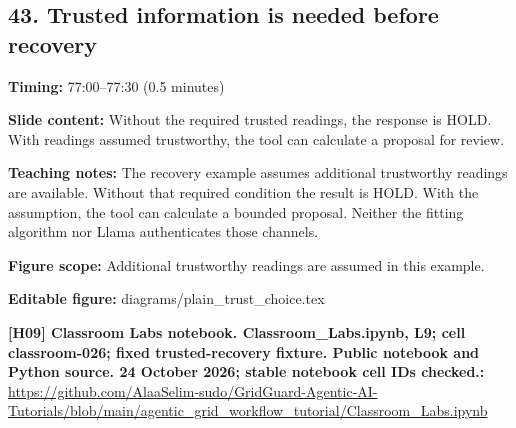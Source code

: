 \documentclass[10pt,letterpaper]{article}
\begin{document}
\subsection*{43. Trusted information is needed before recovery}
\textbf{Timing:} 77:00--77:30 (0.5 minutes)\par
\textbf{Slide content:} Without the required trusted readings, the response is HOLD.
With readings assumed trustworthy, the tool can calculate a proposal for review.\par
\textbf{Teaching notes:} The recovery example assumes additional trustworthy readings are available. Without that required condition the result is HOLD. With the assumption, the tool can calculate a bounded proposal. Neither the fitting algorithm nor Llama authenticates those channels.\par
\textbf{Figure scope:} Additional trustworthy readings are assumed in this example.\par
\textbf{Editable figure:} diagrams/plain\_trust\_choice.tex\par
\textbf{[H09] Classroom Labs notebook. Classroom\_Labs.ipynb, L9; cell classroom-026; fixed trusted-recovery fixture. Public notebook and Python source. 24 October 2026; stable notebook cell IDs checked.:} \href{https://github.com/AlaaSelim-sudo/GridGuard-Agentic-AI-Tutorials/blob/main/agentic_grid_workflow_tutorial/Classroom_Labs.ipynb}{\small\ttfamily https:/\allowbreak{}/\allowbreak{}github.\allowbreak{}com/\allowbreak{}AlaaSelim-\allowbreak{}sudo/\allowbreak{}GridGuard-\allowbreak{}Agentic-\allowbreak{}AI-\allowbreak{}Tutorials/\allowbreak{}blob/\allowbreak{}main/\allowbreak{}agentic\_\allowbreak{}grid\_\allowbreak{}workflow\_\allowbreak{}tutorial/\allowbreak{}Classroom\_\allowbreak{}Labs.\allowbreak{}ipynb}\par
\par\medskip
\end{document}
